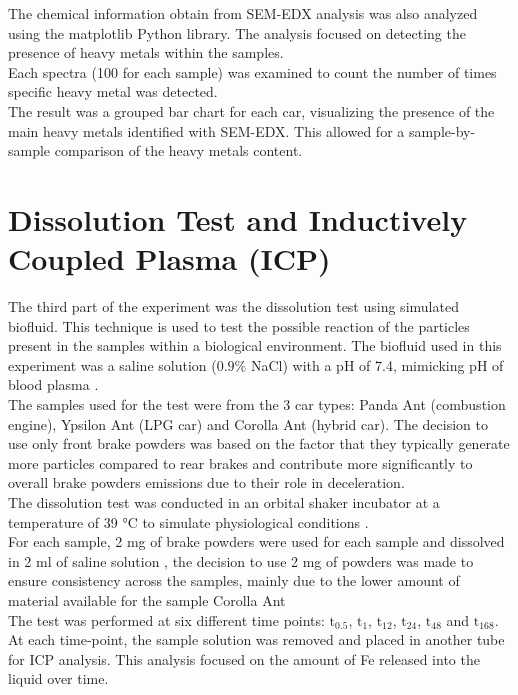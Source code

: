 The chemical information obtain from SEM-EDX analysis was also analyzed using the matplotlib Python library. The analysis focused on detecting the presence of heavy metals within the samples. \\
Each spectra (100 for each sample) was examined to count the number of times specific heavy metal was detected. \\
The result was a grouped bar chart for each car, visualizing the presence of the main heavy metals identified with SEM-EDX. This allowed for a sample-by-sample comparison of the heavy metals content. \\

\section{Dissolution Test and Inductively Coupled Plasma (ICP)}

The third part of the experiment was the dissolution test using simulated biofluid. This technique is used to test the possible reaction of the particles present in the samples within a biological environment. The biofluid used in this experiment was a saline solution ($0.9\%$ NaCl) \cite{innes2021simulated} with a pH of 7.4, mimicking pH of blood plasma \cite{atherton2009acid}. \\
The samples used for the test were from the 3 car types: Panda Ant (combustion engine), Ypsilon Ant (LPG car) and Corolla Ant (hybrid car). The decision to use only front brake powders was based on the factor that they typically generate more particles compared to rear brakes and contribute more significantly to overall brake powders emissions due to their role in deceleration. \\
The dissolution test was conducted in an orbital shaker incubator at a temperature of 39 °C to simulate physiological conditions \cite{rzechorzek2022daily}. \\
For each sample, 2 mg of brake powders were used for each sample and dissolved in 2 ml of saline solution \cite{zhang2022hpmc}, the decision to use 2 mg of powders was made to ensure consistency across the samples, mainly due to the lower amount of material available for the sample Corolla Ant \\
The test was performed at six different time points: $\text{t}_{0.5}$, $\text{t}_{1}$, $\text{t}_{12}$, $\text{t}_{24}$, $\text{t}_{48}$ and $\text{t}_{168}$. At each time-point, the sample solution was removed and placed in another tube for ICP analysis. This analysis focused on the amount of Fe released into the liquid over time.

